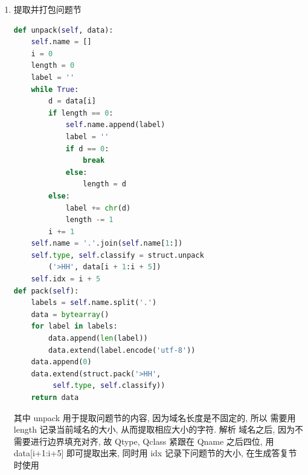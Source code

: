\documentclass[UTF8]{ctexart}
\begin{document}
\begin{sloppypar}
\begin{enumerate}
\begin{lstlisting}[language=Python,
                    frame=single]
    if name in self.config and m.query.type == 1:
        ip = self.config[name]
        if ip == "0.0.0.0":
            response = m.r_pack(ip)
            self.s.sendto(response, addr)
            print('query to %+50s'%name, 'handled
                 as      intercept, takes','%fs'
                 %(time()-start_time),sep='\t')
        else:
            response = m.r_pack(ip)
            self.s.sendto(response, addr)
            print('query to %+50s'%name, 'handled
                 as local resolved, takes','%fs'
                 %(time()-start_time),sep='\t')
    else:
        self.s.sendto(data, self.nameserver)
        self.transaction[m.id]=(addr,name,time())
else:
    if m.id in self.transaction:
        target_addr, name, start_time =
             self.transaction[m.id]
        self.s.sendto(data, target_addr)
        print('query to %+50s'%name, 'handled
             as          relay, takes','%fs'
             %(time()-start_time),sep='\t')
        del self.transaction[m.id]
                \end{lstlisting}
                收到报文后, 记录开始时间用于后面计算处理报文用时, 并调用
                message(data) 分解报文. 若该报文是查询报文, 查询该域名
                是否在配置中, 若在, 判断该报文是否有意义, 若有, 则本地处
                理并发送答复报文, 否则直接阻断, 然后发送答复报文. 若该域
                名不在配置中, 发送给指定的公共 DNS server 处理, 并记录
                该报文信息, 后面收到 DNS server 的答复时匹配. 若该报文
                不是查询报文, 可能是来自公共 DNS server 的答复, 与记录
                中的报文做匹配, 若匹配成功, 则将该报文转发给请求端.
            \item 提取并打包问题节
                \begin{lstlisting}[language=Python,
                    frame=single]
def unpack(self, data):
    self.name = []
    i = 0
    length = 0
    label = ''
    while True:
        d = data[i]
        if length == 0:
            self.name.append(label)
            label = ''
            if d == 0:
                break
            else:
                length = d
        else:
            label += chr(d)
            length -= 1
        i += 1
    self.name = '.'.join(self.name[1:])
    self.type, self.classify = struct.unpack
        ('>HH', data[i + 1:i + 5])
    self.idx = i + 5
def pack(self):
    labels = self.name.split('.')
    data = bytearray()
    for label in labels:
        data.append(len(label))
        data.extend(label.encode('utf-8'))
    data.append(0)
    data.extend(struct.pack('>HH',
         self.type, self.classify))
    return data
                \end{lstlisting}
                其中 unpack 用于提取问题节的内容, 因为域名长度是不固定的, 所以
                需要用 length 记录当前域名的大小, 从而提取相应大小的字符. 解析
                域名之后, 因为不需要进行边界填充对齐, 故 Qtype, Qclass 紧跟在
                Qname 之后四位, 用 data[i+1:i+5] 即可提取出来, 同时用 idx
                记录下问题节的大小, 在生成答复节时使用


\end{enumerate}
\end{sloppypar}
\end{document}
